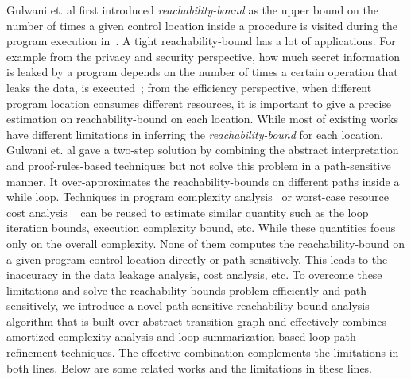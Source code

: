 Gulwani et. al first introduced \emph{reachability-bound} as the upper bound on the number of times a given control location 
inside a procedure is visited during the program execution in~\cite{GulwaniZ10}.
A tight reachability-bound has a lot of applications.
For example from the privacy and security perspective,
how much secret information is leaked by a program depends on the number of times a certain operation that leaks the data,
is executed~\cite{Malacaria07};
from the efficiency perspective, when different program location consumes different resources, it is important to give a precise estimation on reachability-bound on each location.
While most of existing works have different limitations in inferring the \emph{reachability-bound} for each location.
Gulwani et. al
gave a two-step solution by combining the abstract interpretation and proof-rules-based techniques but not solve this problem in a path-sensitive manner.
It over-approximates the reachability-bounds on different paths inside a while loop.
Techniques in program complexity analysis~\cite{GustafssonEL05,HumenbergerJK18} 
or worst-case resource cost analysis
~\cite{BrockschmidtEFFG16,AlbertAGP08,AliasDFG10,Flores-MontoyaH14} can be reused to estimate similar quantity such as the
loop iteration bounds, execution complexity bound, etc.
While these quantities focus only on  
the overall complexity.
None of them computes the reachability-bound on a given program control location directly or path-sensitively.
This leads to the inaccuracy in the data leakage analysis, cost analysis, etc.
To overcome these limitations and solve 
the reachability-bounds problem efficiently and path-sensitively, 
we introduce a novel path-sensitive reachability-bound analysis algorithm that is built over abstract transition graph and effectively combines amortized complexity analysis and loop summarization based loop path refinement techniques.
The effective combination complements the limitations in both lines. Below are some related works and the limitations in these lines.

